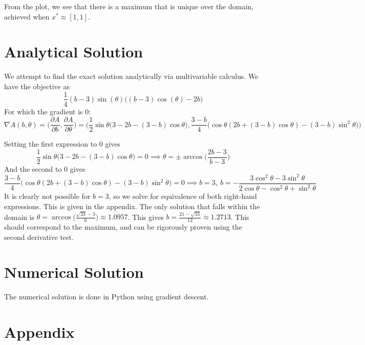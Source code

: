 \documentclass{article}
\begin{document}

From the plot, we see that there is a maximum that is unique over the domain, achieved when $x^* \approx [1,1]$.

\section*{Analytical Solution}
We attempt to find the exact solution analytically via multivariable calculus. We have the objective  as
$$\frac{1}{4}(b-3) \sin(\theta) \big((b-3)\cos(\theta) - 2b \big)$$
For which the gradient is 0:
$$ \nabla A(b,\theta) = \bigg(\frac{\partial A}{\partial b}, \frac{\partial A}{\partial \theta} \bigg) = \bigg(\frac{1}{2} \sin \theta \big(3 - 2b - (3-b)\cos \theta),  \frac{3-b}{4} \big (\cos \theta (2b + (3-b)\cos \theta ) - (3-b) \sin^2 \theta \big)  \bigg)$$

Setting the first expression to 0 gives
$$ \frac{1}{2} \sin \theta \big(3 - 2b - (3-b)\cos \theta) = 0 \implies \theta = \pm \arccos \bigg( \frac{2b-3}{b-3} \bigg)$$
And the second to 0 gives 
$$  \frac{3-b}{4} \big (\cos \theta (2b + (3-b)\cos \theta ) - (3-b) \sin^2 \theta \big) =0  \implies b = 3, \ b = -\frac{3\cos^2 \theta - 3 \sin^2 \theta}{2 \cos \theta 	- \cos^2 \theta + \sin ^2 \theta}$$
It is clearly not possible for $b = 3$, so we solve for equivalence of both right-hand expressions. This is given in the appendix. The only solution that falls within the domain is $\theta = \arccos \big(\frac{\sqrt{33} - 3}{6} \big) \approx 1.0957$. This gives $b = \frac{21 - \sqrt{33}}{12} \approx 1.27	13$. This should correspond to the maximum, and can be rigorously proven using the second derivative test.

\section*{Numerical Solution}
The numerical solution is done in Python using gradient descent. 



\section*{Appendix}
\end{document}
